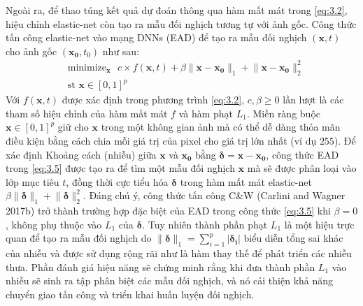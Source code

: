 Ngoài ra, để thao túng kết quả dự đoán thông qua hàm mất mát trong \ref{eq:3.2}, hiệu chỉnh 
elastic-net còn tạo ra mẫu đối nghịch tương tự với ảnh gốc. Công thức tấn công elastic-net
vào mạng DNNs (EAD) để tạo ra mẫu đối nghịch $(\mathbf{x},t)$ cho ảnh gốc $(\mathbf{x_0}, t_0)$ như sau:
\begin{equation}
    \label{eq:3.5}
    \begin{split}
    &\text{minimize}_{\mathbf{x}} \text{ }
    c \times f(\mathbf{x}, t) + \beta \lVert \mathbf{x} - \mathbf{x_0} \rVert_1
    + \lVert \mathbf{x} - \mathbf{x_0} \rVert_2^2 \\
    &\text{st   } \mathbf{x} \in [0,1]^p
    \end{split}
\end{equation}
Với $f(\mathbf{x},t)$ được xác định trong phương trình \ref{eq:3.2}, $c, \beta \geq 0$ lần lượt 
là các tham số  hiệu chỉnh của hàm mất mát $f$ và hàm phạt $L_1$. Miền ràng buộc 
$\mathbf{x} \in [0,1]^p$ giữ cho $\mathbf{x}$ trong một không gian ảnh mà có thể dễ dàng thỏa mãn điều kiện
bằng cách chia mỗi giá trị của pixel cho giá trị lớn nhất (ví dụ $255$). Để xác định Khoảng 
cách (nhiễu) giữa $\mathbf{x}$ và $\mathbf{x_0}$ bằng $\mathbf{\delta} = \mathbf{x} - \mathbf{x_0}$,
công thức EAD trong \ref{eq:3.5} được tạo ra để tìm một mẫu đối nghịch $\mathbf{x}$ mà sẽ 
được phân loại vào lớp mục tiêu $t$, đồng thời cực tiểu hóa $\mathbf{\delta}$ trong hàm
mất mát elastic-net $\beta \lVert \mathbf{\delta} \rVert_1 + \lVert \mathbf{\delta} \rVert_2^2$.
Đáng chú ý, công thức tấn công C\&W (Carlini and Wagner 2017b) trở thành trường hợp đặc biệt 
của EAD trong công thức \ref{eq:3.5} khi $\beta = 0$ , không phụ thuộc vào $L_1$ của $\mathbf{\delta}$.
Tuy nhiên thành phần phạt $L_1$ là một hiệu trực quan để tạo ra mẫu đối nghịch do 
$\lVert \mathbf{\delta} \rVert_1 = \sum_{i=1}^p |\mathbf{\delta_i}|$ biểu diễn tổng sai khác
của nhiễu và được sử dụng rộng rãi như là hàm thay thế để phát triển các nhiễu thưa. 
Phần đánh giá hiệu năng sẽ chứng minh rằng khi đưa thành phần $L_1$ vào nhiễu sẽ sinh ra 
tập phân biệt các mẫu đối nghịch, và nó cải thiện khả năng chuyển giao tấn công và triển 
khai huấn luyện đối nghịch.

